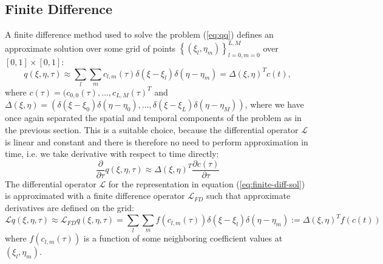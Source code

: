 \documentclass[10pt]{article}
\begin{document}
\subsection{Finite Difference}  \label{sec:finite-difference}
A finite difference method used to solve the problem (\ref{eq:qq})
defines an approximate solution over some grid of points
$\left\{(\xi_l, \eta_m) \right\}_{l=0,m=0}^{L,M}$ over $[0,1] \times [0,1]:$
\begin{equation}
  q(\xi,\eta,\tau) \approx \sum_{l}\sum_{m} c_{l,m}(\tau) \delta(\xi-\xi_l) \delta(\eta-\eta_m) = \Delta(\xi,\eta)^T c(t),\label{eq:finite-diff-sol}
\end{equation}
where $c(\tau) = (c_{0,0}(\tau), \ldots, c_{L,M}(\tau)^T$ and
$\Delta(\xi,\eta) = (\delta(\xi-\xi_0) \delta(\eta-\eta_0), \ldots,
\delta(\xi-\xi_L) \delta(\eta-\eta_M))$, where we have once again
separated the spatial and temporal components of the problem as in the
previous section. This is a suitable choice, because the differential
operator $\mathcal{L}$ is linear and constant and there is therefore
no need to perform approximation in time, i.e. we take derivative with
respect to time directly:
\[
  \frac{\partial}{\partial \tau}q(\xi,\eta,\tau) \approx \Delta(\xi,\eta)^T \frac{\partial c(\tau)}{\partial \tau}
\]
The differential operator $\mathcal{L}$ for the representation in
equation (\ref{eq:finite-diff-sol}) is approximated with a finite
difference operator $\mathcal{L}_{FD}$ such that approximate derivatives are defined on the grid:
\[
  \mathcal{L}q(\xi,\eta,\tau) \approx \mathcal{L}_{FD}q(\xi,\eta,\tau) = \sum_{l}\sum_{m} f(c_{l,m}(\tau)) \delta(\xi-\xi_l) \delta(\eta-\eta_m) := \Delta(\xi,\eta)^T f(c(t))
\]
where $f(c_{l,m}(\tau))$ is a function of some neighboring coefficient
values at $(\xi_l, \eta_m)$.
\end{document}
